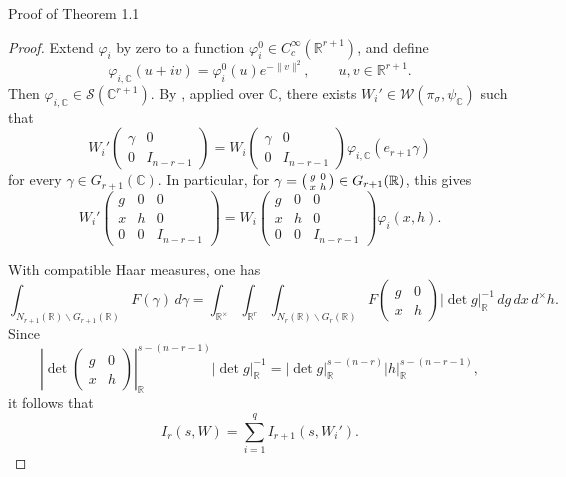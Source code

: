 \documentclass[12pt,reqno]{amsart}
\numberwithin{equation}{section}%
\numberwithin{equation}{subsection}
\theoremstyle{definition}
\theoremstyle{remark}
\begin{document}
\begin{section}{Proof of Theorem 1.1}
\begin{proof}
Extend $\varphi_i$ by zero to a function
$\varphi_i^0\in C_c^\infty(\mathbb R^{r+1})$, and define
\[
\varphi_{i,\mathbb C}(u+iv)
=
\varphi_i^0(u)e^{-\lVert v\rVert^2},
\qquad
u,v\in\mathbb R^{r+1}.
\]
Then $\varphi_{i,\mathbb C}\in\mathcal{S}(\mathbb C^{r+1})$.
By \cite[Proposition~6.1]{Jac2009}, applied over $\mathbb C$, there exists
$W_i'\in\mathcal{W}(\pi_\sigma,\psi_{\mathbb C})$ such that
\[
 W_i'
\begin{pmatrix}
\gamma&0\\
0&I_{n-r-1}
\end{pmatrix}
=
W_i
\begin{pmatrix}
\gamma&0\\
0&I_{n-r-1}
\end{pmatrix}
\varphi_{i,\mathbb C}(e_{r+1}\gamma)
\]
for every $\gamma\in G_{r+1}(\mathbb C)$. In particular, for
$\gamma=\begin{psmallmatrix}g&0\\ x&h\end{psmallmatrix}\in
G_{r+1}(\mathbb R)$, this gives
\[
W_i'
\begin{pmatrix}
g&0&0\\
x&h&0\\
0&0&I_{n-r-1}
\end{pmatrix}
=
W_i
\begin{pmatrix}
g&0&0\\
x&h&0\\
0&0&I_{n-r-1}
\end{pmatrix}
\varphi_i(x,h).
\]

With compatible Haar measures, one has
\[
\int_{N_{r+1}(\mathbb R)\backslash G_{r+1}(\mathbb R)}
F(\gamma)\,d\gamma
=
\int_{\mathbb R^\times}
\int_{\mathbb R^r}
\int_{N_r(\mathbb R)\backslash G_r(\mathbb R)}
F\begin{pmatrix}g&0\\x&h\end{pmatrix}
|\det g|_{\mathbb R}^{-1}\,dg\,dx\,d^\times h.
\]
Since
\[
\left|
\det
\begin{pmatrix}
g&0\\
x&h
\end{pmatrix}
\right|_{\mathbb R}^{s-(n-r-1)}
|\det g|_{\mathbb R}^{-1}
=
|\det g|_{\mathbb R}^{s-(n-r)}
|h|_{\mathbb R}^{s-(n-r-1)},
\]
it follows that
\begin{equation}\label{induct}
    I_r(s,W)=\sum_{i=1}^q I_{r+1}(s,W_i').
\end{equation}


\end{proof}
\end{section}
\end{document}
